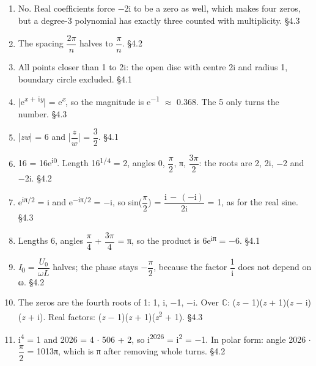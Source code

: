 \documentclass[11pt]{article}
\begin{document}
\begin{keepsection}
\begin{enumerate}
\item No. Real coefficients force \ensuremath{-}2i to be a zero as well, which makes four zeros, but a degree-3 polynomial has exactly three counted with multiplicity. \hfill{\small\color{FAUblue}§4.3}
\item The spacing {\small\ensuremath{\dfrac{2π}{{n}}}} halves to {\small\ensuremath{\dfrac{π}{{n}}}}. \hfill{\small\color{FAUblue}§4.2}
\item All points closer than 1 to 2i: the open disc with centre 2i and radius 1, boundary circle excluded. \hfill{\small\color{FAUblue}§4.1}
\item |e\textsuperscript{\textit{x} + i\textit{y}}| = e\textsuperscript{\textit{x}}, so the magnitude is e\textsuperscript{\ensuremath{-}1} \ensuremath{\approx} 0.368. The 5 only turns the number. \hfill{\small\color{FAUblue}§4.3}
\item |\textit{z}\textit{w}| = 6 and |{\small\ensuremath{\dfrac{{z}}{{w}}}}| = {\small\ensuremath{\dfrac{3}{2}}}. \hfill{\small\color{FAUblue}§4.1}
\item 16 = 16e\textsuperscript{i0}. Length 16\textsuperscript{1/4} = 2, angles 0, {\small\ensuremath{\dfrac{π}{2}}}, π, {\small\ensuremath{\dfrac{3π}{2}}}: the roots are 2, 2i, \ensuremath{-}2 and \ensuremath{-}2i. \hfill{\small\color{FAUblue}§4.2}
\item e\textsuperscript{iπ/2} = i and e\textsuperscript{\ensuremath{-}iπ/2} = \ensuremath{-}i, so sin({\small\ensuremath{\dfrac{π}{2}}}) = {\small\ensuremath{\dfrac{\mathrm{i}\, -\, (-\mathrm{i})}{2\mathrm{i}}}} = 1, as for the real sine. \hfill{\small\color{FAUblue}§4.3}
\item Lengths 6, angles {\small\ensuremath{\dfrac{π}{4}}} + {\small\ensuremath{\dfrac{3π}{4}}} = π, so the product is 6e\textsuperscript{iπ} = \ensuremath{-}6. \hfill{\small\color{FAUblue}§4.1}
\item \textit{I}\textsubscript{0} = {\small\ensuremath{\dfrac{{U}_{0}}{ω{L}}}} halves; the phase stays \ensuremath{-}{\small\ensuremath{\dfrac{π}{2}}}, because the factor {\small\ensuremath{\dfrac{1}{\mathrm{i}}}} does not depend on ω. \hfill{\small\color{FAUblue}§4.2}
\item The zeros are the fourth roots of 1: 1, i, \ensuremath{-}1, \ensuremath{-}i. Over \ensuremath{\mathbb{C}}: (\textit{z} \ensuremath{-} 1)(\textit{z} + 1)(\textit{z} \ensuremath{-} i)(\textit{z} + i). Real factors: (\textit{z} \ensuremath{-} 1)(\textit{z} + 1)(\textit{z}\textsuperscript{2} + 1). \hfill{\small\color{FAUblue}§4.3}
\item i\textsuperscript{4} = 1 and 2026 = 4 \ensuremath{\cdot} 506 + 2, so i\textsuperscript{2026} = i\textsuperscript{2} = \ensuremath{-}1. In polar form: angle 2026 \ensuremath{\cdot} {\small\ensuremath{\dfrac{π}{2}}} = 1013π, which is π after removing whole turns. \hfill{\small\color{FAUblue}§4.2}

\end{enumerate}
\end{keepsection}
\end{document}
